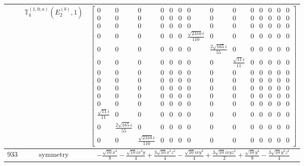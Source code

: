 \documentclass[fleqn,8pt,landscape]{jsarticle}
\begin{document}
\begin{longtable}{ccc}
$  $ & $ \mathbb{T}_{4}^{(1,0;a)}(E_{2}^{(b)},1) $ & $ \begin{bmatrix} 0 & 0 & 0 & 0 & 0 & 0 & 0 & 0 & 0 & 0 & 0 & 0 & 0 & 0 \\ 0 & 0 & 0 & 0 & 0 & 0 & 0 & 0 & 0 & 0 & 0 & 0 & 0 & 0 \\ 0 & 0 & 0 & 0 & 0 & 0 & 0 & 0 & 0 & 0 & 0 & 0 & 0 & 0 \\ 0 & 0 & 0 & 0 & 0 & 0 & \frac{\sqrt{2310} i}{110} & 0 & 0 & 0 & 0 & 0 & 0 & 0 \\ 0 & 0 & 0 & 0 & 0 & 0 & 0 & \frac{2 \sqrt{165} i}{55} & 0 & 0 & 0 & 0 & 0 & 0 \\ 0 & 0 & 0 & 0 & 0 & 0 & 0 & 0 & \frac{\sqrt{11} i}{11} & 0 & 0 & 0 & 0 & 0 \\ 0 & 0 & 0 & 0 & 0 & 0 & 0 & 0 & 0 & 0 & 0 & 0 & 0 & 0 \\ 0 & 0 & 0 & 0 & 0 & 0 & 0 & 0 & 0 & 0 & 0 & 0 & 0 & 0 \\ 0 & 0 & 0 & 0 & 0 & 0 & 0 & 0 & 0 & 0 & 0 & 0 & 0 & 0 \\ 0 & 0 & 0 & 0 & 0 & 0 & 0 & 0 & 0 & 0 & 0 & 0 & 0 & 0 \\ 0 & 0 & 0 & 0 & 0 & 0 & 0 & 0 & 0 & 0 & 0 & 0 & 0 & 0 \\ \frac{\sqrt{11} i}{11} & 0 & 0 & 0 & 0 & 0 & 0 & 0 & 0 & 0 & 0 & 0 & 0 & 0 \\ 0 & \frac{2 \sqrt{165} i}{55} & 0 & 0 & 0 & 0 & 0 & 0 & 0 & 0 & 0 & 0 & 0 & 0 \\ 0 & 0 & \frac{\sqrt{2310} i}{110} & 0 & 0 & 0 & 0 & 0 & 0 & 0 & 0 & 0 & 0 & 0 \end{bmatrix} $ \\ \hline
$ 933 $ & $ \text{symmetry} $ & $ - \frac{\sqrt{10} x^{4}}{8} - \frac{\sqrt{10} i x^{3} y}{4} + \frac{3 \sqrt{10} x^{2} z^{2}}{4} - \frac{\sqrt{10} i x y^{3}}{4} + \frac{3 \sqrt{10} i x y z^{2}}{2} + \frac{\sqrt{10} y^{4}}{8} - \frac{3 \sqrt{10} y^{2} z^{2}}{4} $ \\

\end{longtable}
\end{document}
